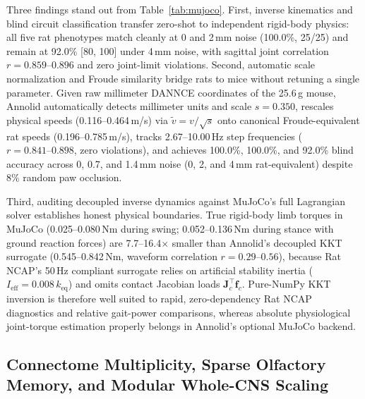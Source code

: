 \documentclass[10pt,twocolumn,letterpaper]{article}
\begin{document}
Three findings stand out from Table~\ref{tab:mujoco}. First, inverse kinematics and blind circuit classification transfer zero-shot to independent rigid-body physics: all five rat phenotypes match cleanly at 0 and 2\,mm noise (100.0\%, 25/25) and remain at 92.0\% [80, 100] under 4\,mm noise, with sagittal joint correlation $r=0.859\text{--}0.896$ and zero joint-limit violations. Second, automatic scale normalization and Froude similarity bridge rats to mice without retuning a single parameter. Given raw millimeter DANNCE coordinates of the 25.6\,g mouse, Annolid automatically detects millimeter units and scale $s=0.350$, rescales physical speeds (0.116--0.464\,m/s) via $\tilde{v}=v/\sqrt{s}$ onto canonical Froude-equivalent rat speeds (0.196--0.785\,m/s), tracks 2.67--10.00\,Hz step frequencies ($r=0.841\text{--}0.898$, zero violations), and achieves 100.0\%, 100.0\%, and 92.0\% blind accuracy across 0, 0.7, and 1.4\,mm noise (0, 2, and 4\,mm rat-equivalent) despite 8\% random paw occlusion.

Third, auditing decoupled inverse dynamics against MuJoCo's full Lagrangian solver establishes honest physical boundaries. True rigid-body limb torques in MuJoCo (0.025--0.080\,Nm during swing; 0.052--0.136\,Nm during stance with ground reaction forces) are 7.7--16.4$\times$ smaller than Annolid's decoupled KKT surrogate (0.545--0.842\,Nm, waveform correlation $r=0.29\text{--}0.56$), because Rat NCAP's 50\,Hz compliant surrogate relies on artificial stability inertia ($I_{\mathrm{eff}} = 0.008\,k_{\mathrm{eq}}$) and omits contact Jacobian loads $\mathbf{J}_c^\top \mathbf{f}_c$. Pure-NumPy KKT inversion is therefore well suited to rapid, zero-dependency Rat NCAP diagnostics and relative gait-power comparisons, whereas absolute physiological joint-torque estimation properly belongs in Annolid's optional MuJoCo backend.

\subsection{Connectome Multiplicity, Sparse Olfactory Memory, and Modular Whole-CNS Scaling}
\end{document}
